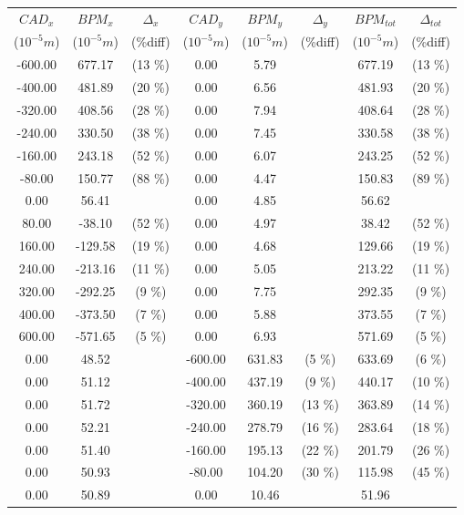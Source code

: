 \begin{table}
\centering
\begin{tabular}{c c c c c c c c}
\toprule
\textbf{$CAD_{x}$} & \textbf{$BPM_{x}$ } & \textbf{$\Delta_{x}$} &\textbf{$CAD_{y}$} & \textbf{$BPM_{y}$} & \textbf{$\Delta_{y}$} & \textbf{$BPM_{tot}$} & \textbf{$\Delta_{tot}$} \\
($10^{-5} m$) & ($10^{-5} m$) & (\%diff) & ($10^{-5} m$) & ($10^{-5} m$) & (\%diff) & ($10^{-5} m$) & (\%diff) \\
\midrule
-600.00 & 677.17 &  (13 \%) & 0.00 & 5.79 &  & 677.19 &  (13 \%)\\
-400.00 & 481.89 &  (20 \%) & 0.00 & 6.56 &  & 481.93 &  (20 \%)\\
-320.00 & 408.56 &  (28 \%) & 0.00 & 7.94 &  & 408.64 &  (28 \%)\\
-240.00 & 330.50 &  (38 \%) & 0.00 & 7.45 &  & 330.58 &  (38 \%)\\
-160.00 & 243.18 &  (52 \%) & 0.00 & 6.07 &  & 243.25 &  (52 \%)\\
-80.00 & 150.77 &  (88 \%) & 0.00 & 4.47 &  & 150.83 &  (89 \%)\\
0.00 & 56.41 &  & 0.00 & 4.85 &  & 56.62 & \\
80.00 & -38.10 &  (52 \%) & 0.00 & 4.97 &  & 38.42 &  (52 \%)\\
160.00 & -129.58 &  (19 \%) & 0.00 & 4.68 &  & 129.66 &  (19 \%)\\
240.00 & -213.16 &  (11 \%) & 0.00 & 5.05 &  & 213.22 &  (11 \%)\\
320.00 & -292.25 &  (9 \%) & 0.00 & 7.75 &  & 292.35 &  (9 \%)\\
400.00 & -373.50 &  (7 \%) & 0.00 & 5.88 &  & 373.55 &  (7 \%)\\
600.00 & -571.65 &  (5 \%) & 0.00 & 6.93 &  & 571.69 &  (5 \%)\\
0.00 & 48.52 &  & -600.00 & 631.83 &  (5 \%) & 633.69 &  (6 \%)\\
0.00 & 51.12 &  & -400.00 & 437.19 &  (9 \%) & 440.17 &  (10 \%)\\
0.00 & 51.72 &  & -320.00 & 360.19 &  (13 \%) & 363.89 &  (14 \%)\\
0.00 & 52.21 &  & -240.00 & 278.79 &  (16 \%) & 283.64 &  (18 \%)\\
0.00 & 51.40 &  & -160.00 & 195.13 &  (22 \%) & 201.79 &  (26 \%)\\
0.00 & 50.93 &  & -80.00 & 104.20 &  (30 \%) & 115.98 &  (45 \%)\\
0.00 & 50.89 &  & 0.00 & 10.46 &  & 51.96 & \\

\end{tabular}
\end{table}
